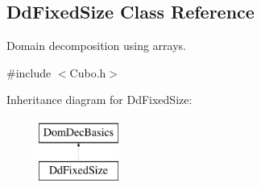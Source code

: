 \hypertarget{classDdFixedSize}{\subsection{\-Dd\-Fixed\-Size \-Class \-Reference}
\label{classDdFixedSize}
}


\-Domain decomposition using arrays.  




{\ttfamily \#include $<$\-Cubo.\-h$>$}

\-Inheritance diagram for \-Dd\-Fixed\-Size\-:\begin{figure}[H]
\begin{center}
\leavevmode
\includegraphics[height=2.000000cm]{classDdFixedSize}
\end{center}
\end{figure}
